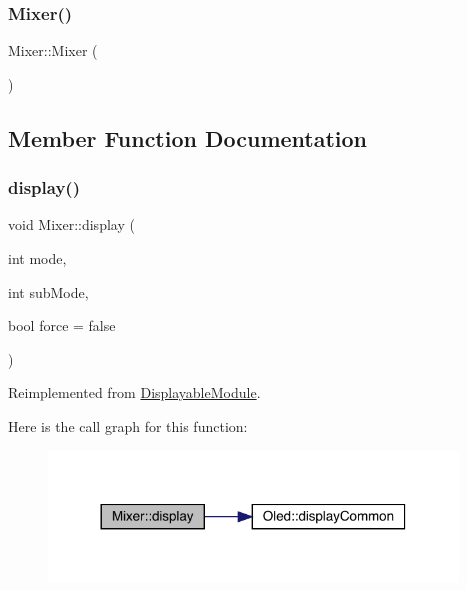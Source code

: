 \subsubsection{\texorpdfstring{Mixer()}{Mixer()}}
{\footnotesize\ttfamily Mixer\+::\+Mixer (\begin{DoxyParamCaption}{ }\end{DoxyParamCaption})}



\subsection{Member Function Documentation}
\mbox{\label{class_mixer_a13c7c7e025c83d2f9a22b4c16b400551}} 
\subsubsection{\texorpdfstring{display()}{display()}}
{\footnotesize\ttfamily void Mixer\+::display (\begin{DoxyParamCaption}\item[{int}]{mode,  }\item[{int}]{sub\+Mode,  }\item[{bool}]{force = {\ttfamily false} }\end{DoxyParamCaption})\hspace{0.3cm}{\ttfamily [virtual]}}



Reimplemented from \mbox{\hyperlink{class_displayable_module_a02de26d62ef508cae9ed07920e21784d}{Displayable\+Module}}.

Here is the call graph for this function\+:\nopagebreak
\begin{figure}[H]
\begin{center}
\leavevmode
\includegraphics[width=308pt]{class_mixer_a13c7c7e025c83d2f9a22b4c16b400551_cgraph}
\end{center}
\end{figure}
\mbox{\label{class_mixer_a2fb26b5f207f864ed15db5ae6ae69850}} 
